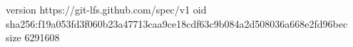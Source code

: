 version https://git-lfs.github.com/spec/v1
oid sha256:f19a053fd3f060b23a47713caa9ce18cdf63c9b084a2d508036a668e2fd96bec
size 6291608
